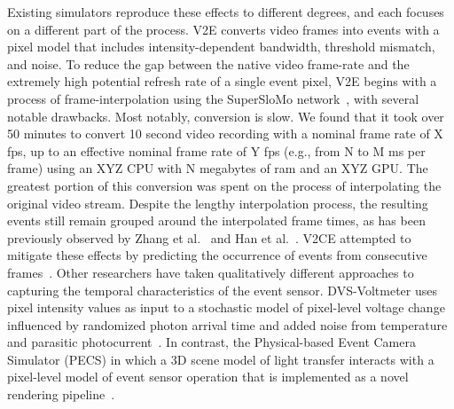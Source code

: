 

Existing simulators reproduce these effects to different degrees, and each focuses on a different part of the process. V2E converts video frames into events with a pixel model that includes intensity-dependent bandwidth, threshold mismatch, and noise.  To reduce the gap between the native video frame-rate and the extremely high potential refresh rate of a single event pixel, V2E begins with a process of frame-interpolation using the SuperSloMo network~\cite{hu2021v2e}, with several notable drawbacks. Most notably, conversion is slow. We found that it took over 50 minutes to convert 10 second video recording with a nominal frame rate of X fps, up to an effective nominal frame rate of Y fps (e.g., from N to M ms per frame) using an XYZ CPU with N megabytes of ram and an XYZ GPU. The greatest portion of this conversion was spent on the process of interpolating the original video stream. Despite the lengthy interpolation process, the resulting events still remain grouped around the interpolated frame times, as has been previously observed by Zhang et al.~\cite{zhang2024v2ce} and Han et al.~\cite{han2024pecs}. V2CE attempted to mitigate these effects by predicting the occurrence of events from consecutive frames~\cite{zhang2024v2ce}. Other researchers have taken qualitatively different approaches to capturing the temporal characteristics of the event sensor. DVS-Voltmeter uses pixel intensity values as input to a stochastic model of pixel-level voltage change influenced by randomized photon arrival time and added noise from temperature and parasitic photocurrent~\cite{lin2022dvsvoltmeter}.  In contrast, the Physical-based Event Camera Simulator (PECS) in which a 3D scene model of light transfer interacts with a pixel-level model of event sensor operation that is implemented as a novel rendering pipeline~\cite{han2024pecs}.



